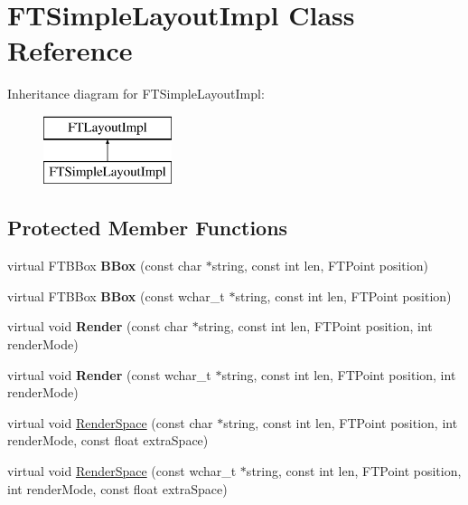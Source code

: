 \hypertarget{class_f_t_simple_layout_impl}{}\section{F\+T\+Simple\+Layout\+Impl Class Reference}
\label{class_f_t_simple_layout_impl}
Inheritance diagram for F\+T\+Simple\+Layout\+Impl\+:\begin{figure}[H]
\begin{center}
\leavevmode
\includegraphics[height=2.000000cm]{class_f_t_simple_layout_impl}
\end{center}
\end{figure}
\subsection*{Protected Member Functions}
\begin{DoxyCompactItemize}
\item 
virtual F\+T\+B\+Box {\bfseries B\+Box} (const char $\ast$string, const int len, F\+T\+Point position)\hypertarget{class_f_t_simple_layout_impl_a6cdedbc1045881dcb3ddedea054a7987}{}\label{class_f_t_simple_layout_impl_a6cdedbc1045881dcb3ddedea054a7987}

\item 
virtual F\+T\+B\+Box {\bfseries B\+Box} (const wchar\+\_\+t $\ast$string, const int len, F\+T\+Point position)\hypertarget{class_f_t_simple_layout_impl_a682650a15a67eb182b2de9e7001875cb}{}\label{class_f_t_simple_layout_impl_a682650a15a67eb182b2de9e7001875cb}

\item 
virtual void {\bfseries Render} (const char $\ast$string, const int len, F\+T\+Point position, int render\+Mode)\hypertarget{class_f_t_simple_layout_impl_abfe85f44b3d4a2f8691b5e11ab26828a}{}\label{class_f_t_simple_layout_impl_abfe85f44b3d4a2f8691b5e11ab26828a}

\item 
virtual void {\bfseries Render} (const wchar\+\_\+t $\ast$string, const int len, F\+T\+Point position, int render\+Mode)\hypertarget{class_f_t_simple_layout_impl_ac69f1a3cdac5e6dd692b547df3f77825}{}\label{class_f_t_simple_layout_impl_ac69f1a3cdac5e6dd692b547df3f77825}

\item 
virtual void \hyperlink{class_f_t_simple_layout_impl_abdbd064c650f1e17d2bd3139536aff47}{Render\+Space} (const char $\ast$string, const int len, F\+T\+Point position, int render\+Mode, const float extra\+Space)
\item 
virtual void \hyperlink{class_f_t_simple_layout_impl_a6b5334d053e9c79dd459f8b88c0e60a4}{Render\+Space} (const wchar\+\_\+t $\ast$string, const int len, F\+T\+Point position, int render\+Mode, const float extra\+Space)
\end{DoxyCompactItemize}
